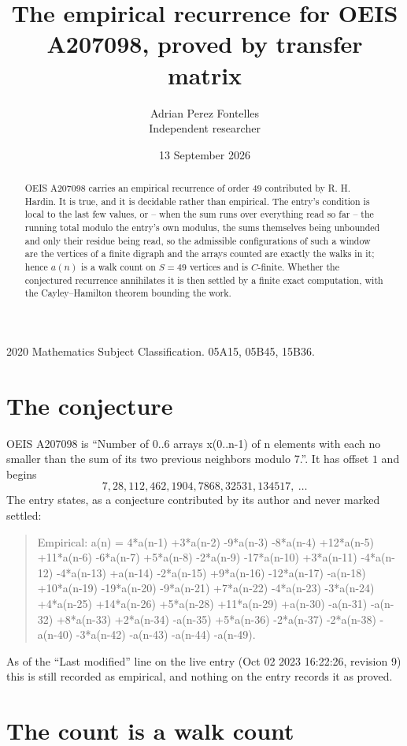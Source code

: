 \documentclass[11pt,a4paper]{article}
\title{The empirical recurrence for OEIS A207098, proved by transfer matrix}
\author{Adrian Perez Fontelles\\ \small Independent researcher}
\date{13 September 2026}
\theoremstyle{plain}
\theoremstyle{definition}
\begin{document}
\maketitle

\begin{abstract}
OEIS A207098 carries an empirical recurrence of order $49$ contributed by R. H. Hardin. It is
true, and it is decidable rather than empirical. The entry's condition is local to the last few values, or -- when the sum runs over everything read so far -- the running total modulo the entry's own modulus, the sums themselves being unbounded and only their residue being read, so
the admissible configurations of such a window are the vertices of a finite digraph and the
arrays counted are exactly the walks in it; hence $a(n)$ is a walk count on $S=49$ vertices
and is $C$-finite. Whether the conjectured recurrence annihilates it is then settled by a
finite exact computation, with the Cayley--Hamilton theorem bounding the work.
\end{abstract}

\noindent\small 2020 Mathematics Subject Classification. 05A15, 05B45, 15B36.\normalsize

\section{The conjecture}

OEIS A207098 is ``Number of 0..6 arrays x(0..n-1) of n elements with each no smaller than the sum of its two previous neighbors modulo 7.''. It has offset $1$ and begins
\[
7, 28, 112, 462, 1904, 7868, 32531, 134517,\ \dots
\]
The entry states, as a conjecture contributed by its author and never marked settled:
\begin{quote}
Empirical: a(n) = 4*a(n-1) +3*a(n-2) -9*a(n-3) -8*a(n-4) +12*a(n-5) +11*a(n-6) -6*a(n-7) +5*a(n-8) -2*a(n-9) -17*a(n-10) +3*a(n-11) -4*a(n-12) -4*a(n-13) +a(n-14) -2*a(n-15) +9*a(n-16) -12*a(n-17) -a(n-18) +10*a(n-19) -19*a(n-20) -9*a(n-21) +7*a(n-22) -4*a(n-23) -3*a(n-24) +4*a(n-25) +14*a(n-26) +5*a(n-28) +11*a(n-29) +a(n-30) -a(n-31) -a(n-32) +8*a(n-33) +2*a(n-34) -a(n-35) +5*a(n-36) -2*a(n-37) -2*a(n-38) -a(n-40) -3*a(n-42) -a(n-43) -a(n-44) -a(n-49).
\end{quote}
As of the ``Last modified'' line on the live entry (Oct 02 2023 16:22:26, revision 9) this is still
recorded as empirical, and nothing on the entry records it as proved.

\section{The count is a walk count}
\end{document}
